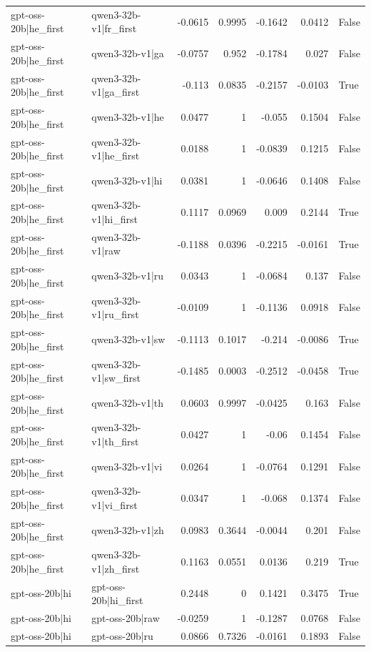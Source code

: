 \begin{table}
\begin{tabular}{l l r r r r l}
gpt-oss-20b|he_first & qwen3-32b-v1|fr_first & -0.0615 & 0.9995 & -0.1642 & 0.0412 & False \\
gpt-oss-20b|he_first & qwen3-32b-v1|ga & -0.0757 & 0.952 & -0.1784 & 0.027 & False \\
gpt-oss-20b|he_first & qwen3-32b-v1|ga_first & -0.113 & 0.0835 & -0.2157 & -0.0103 & True \\
gpt-oss-20b|he_first & qwen3-32b-v1|he & 0.0477 & 1 & -0.055 & 0.1504 & False \\
gpt-oss-20b|he_first & qwen3-32b-v1|he_first & 0.0188 & 1 & -0.0839 & 0.1215 & False \\
gpt-oss-20b|he_first & qwen3-32b-v1|hi & 0.0381 & 1 & -0.0646 & 0.1408 & False \\
gpt-oss-20b|he_first & qwen3-32b-v1|hi_first & 0.1117 & 0.0969 & 0.009 & 0.2144 & True \\
gpt-oss-20b|he_first & qwen3-32b-v1|raw & -0.1188 & 0.0396 & -0.2215 & -0.0161 & True \\
gpt-oss-20b|he_first & qwen3-32b-v1|ru & 0.0343 & 1 & -0.0684 & 0.137 & False \\
gpt-oss-20b|he_first & qwen3-32b-v1|ru_first & -0.0109 & 1 & -0.1136 & 0.0918 & False \\
gpt-oss-20b|he_first & qwen3-32b-v1|sw & -0.1113 & 0.1017 & -0.214 & -0.0086 & True \\
gpt-oss-20b|he_first & qwen3-32b-v1|sw_first & -0.1485 & 0.0003 & -0.2512 & -0.0458 & True \\
gpt-oss-20b|he_first & qwen3-32b-v1|th & 0.0603 & 0.9997 & -0.0425 & 0.163 & False \\
gpt-oss-20b|he_first & qwen3-32b-v1|th_first & 0.0427 & 1 & -0.06 & 0.1454 & False \\
gpt-oss-20b|he_first & qwen3-32b-v1|vi & 0.0264 & 1 & -0.0764 & 0.1291 & False \\
gpt-oss-20b|he_first & qwen3-32b-v1|vi_first & 0.0347 & 1 & -0.068 & 0.1374 & False \\
gpt-oss-20b|he_first & qwen3-32b-v1|zh & 0.0983 & 0.3644 & -0.0044 & 0.201 & False \\
gpt-oss-20b|he_first & qwen3-32b-v1|zh_first & 0.1163 & 0.0551 & 0.0136 & 0.219 & True \\
gpt-oss-20b|hi & gpt-oss-20b|hi_first & 0.2448 & 0 & 0.1421 & 0.3475 & True \\
gpt-oss-20b|hi & gpt-oss-20b|raw & -0.0259 & 1 & -0.1287 & 0.0768 & False \\
gpt-oss-20b|hi & gpt-oss-20b|ru & 0.0866 & 0.7326 & -0.0161 & 0.1893 & False \\

\end{tabular}
\end{table}
